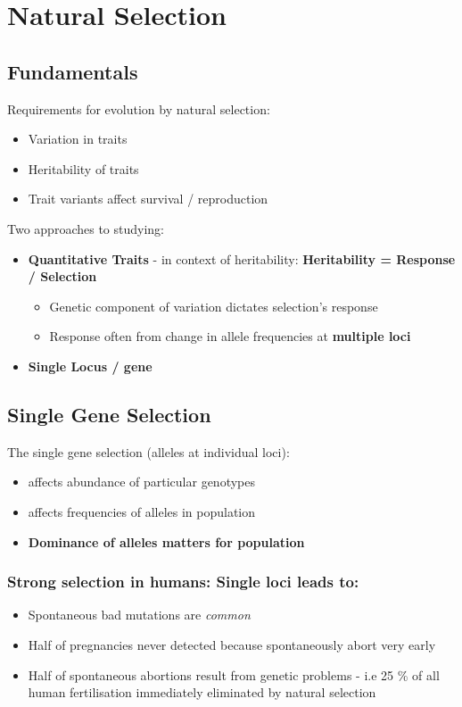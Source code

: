 \documentclass{scrartcl}
\begin{document}
\section{Natural Selection}
\label{sec:07}
\subsection{Fundamentals}
\label{sec:07-01}
Requirements for evolution by natural selection:
\begin{itemize}
\item Variation in traits
\item Heritability of traits
\item Trait variants affect survival / reproduction
\end{itemize}
Two approaches to studying:
\begin{itemize}
\item {\bf Quantitative Traits} - in context of heritability: {\bf Heritability = Response / Selection}
  \begin{itemize}
  \item Genetic component of variation dictates selection's response
  \item Response often from change in allele frequencies at {\bf multiple loci}
  \end{itemize}
\item {\bf Single Locus / gene}
\end{itemize}

\subsection{Single Gene Selection}
\label{sec:07-01-01}
The single gene selection (alleles at individual loci):
\begin{itemize}
\item affects abundance of particular genotypes
\item affects frequencies of alleles in population
\item {\bf Dominance of alleles matters for population}
\end{itemize}

\subsubsection{Strong selection in humans: Single loci leads to:}
\label{sec:07-01-02}
\begin{itemize}
\item Spontaneous bad mutations are {\em common}
\item Half of pregnancies never detected because spontaneously abort very early
\item Half of spontaneous abortions result from genetic problems - i.e 25 \% of all human fertilisation immediately eliminated by natural selection
\end{itemize}
\end{document}
